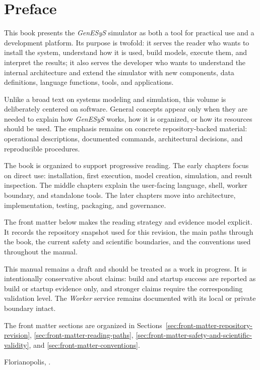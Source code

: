 \chapter*{Preface}

This book presents the \textit{GenESyS} simulator as both a tool for practical use and a development platform. Its purpose is twofold: it serves the reader who wants to install the system, understand how it is used, build models, execute them, and interpret the results; it also serves the developer who wants to understand the internal architecture and extend the simulator with new components, data definitions, language functions, tools, and applications.

Unlike a broad text on systems modeling and simulation, this volume is deliberately centered on software. General concepts appear only when they are needed to explain how \textit{GenESyS} works, how it is organized, or how its resources should be used. The emphasis remains on concrete repository-backed material: operational descriptions, documented commands, architectural decisions, and reproducible procedures.

The book is organized to support progressive reading. The early chapters focus on direct use: installation, first execution, model creation, simulation, and result inspection. The middle chapters explain the user-facing language, shell, worker boundary, and standalone tools. The later chapters move into architecture, implementation, testing, packaging, and governance.

The front matter below makes the reading strategy and evidence model explicit. It records the repository snapshot used for this revision, the main paths through the book, the current safety and scientific boundaries, and the conventions used throughout the manual.






This manual remains a draft and should be treated as a work in progress. It is intentionally conservative about claims: build and startup success are reported as build or startup evidence only, and stronger claims require the corresponding validation level. The \textit{Worker} service remains documented with its local or private boundary intact.

The front matter sections are organized in Sections~\ref{sec:front-matter-repository-revision}, \ref{sec:front-matter-reading-paths}, \ref{sec:front-matter-safety-and-scientific-validity}, and \ref{sec:front-matter-conventions}.

\noindent Florianopolis, \datalonga.
